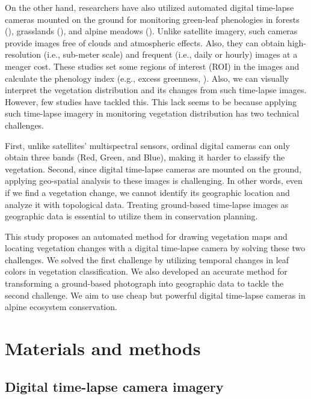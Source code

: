 \documentclass{article}
\begin{document}
On the other hand, researchers have also utilized automated digital
time-lapse cameras mounted on the ground for monitoring green-leaf
phenologies in forests (\cite{Richardson2009EcolAppl}), grasslands
(\cite{Browning2017RemSen}), and alpine meadows
(\cite{IdeOguma2013EcolInfom}). Unlike satellite imagery, such cameras
provide images free of clouds and atmospheric effects. Also, they can
obtain high-resolution (i.e., sub-meter scale) and frequent (i.e., daily
or hourly) images at a meager cost. These studies set some regions of
interest (ROI) in the images and calculate the phenology index (e.g.,
excess greenness, \cite{Woebbecke1995ASAE}). Also, we can visually
interpret the vegetation distribution and its changes from such
time-lapse images. However, few studies have tackled this. This lack
seems to be because applying such time-lapse imagery in monitoring
vegetation distribution has two technical challenges.

First, unlike satellites' multispectral sensors, ordinal digital cameras
can only obtain three bands (Red, Green, and Blue), making it harder to
classify the vegetation. Second, since digital time-lapse cameras are
mounted on the ground, applying geo-spatial analysis to these images is
challenging. In other words, even if we find a vegetation change, we
cannot identify its geographic location and analyze it with topological
data. Treating ground-based time-lapse images as geographic data is
essential to utilize them in conservation planning.

This study proposes an automated method for drawing vegetation maps and
locating vegetation changes with a digital time-lapse camera by solving
these two challenges. We solved the first challenge by utilizing
temporal changes in leaf colors in vegetation classification. We also
developed an accurate method for transforming a ground-based photograph
into geographic data to tackle the second challenge. We aim to use cheap
but powerful digital time-lapse cameras in alpine ecosystem
conservation.

\hypertarget{materials-and-methods}{%
\section{Materials and methods}\label{materials-and-methods}}

\hypertarget{digital-time-lapse-camera-imagery}{%
\subsection{Digital time-lapse camera
imagery}\label{digital-time-lapse-camera-imagery}}
\end{document}
